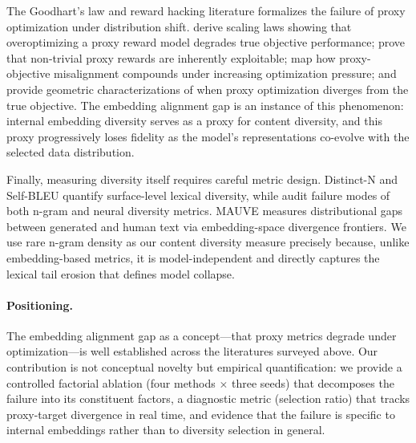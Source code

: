 The Goodhart's law and reward hacking literature formalizes the failure of proxy optimization under distribution shift. \citet{gao2023scaling} derive scaling laws showing that overoptimizing a proxy reward model degrades true objective performance; \citet{skalse2022defining} prove that non-trivial proxy rewards are inherently exploitable; \citet{pan2022effects} map how proxy-objective misalignment compounds under increasing optimization pressure; and \citet{karwowski2024goodhart} provide geometric characterizations of when proxy optimization diverges from the true objective. The embedding alignment gap is an instance of this phenomenon: internal embedding diversity serves as a proxy for content diversity, and this proxy progressively loses fidelity as the model's representations co-evolve with the selected data distribution.

Finally, measuring diversity itself requires careful metric design. Distinct-N \citep{li2016diversity} and Self-BLEU \citep{zhu2018texygen} quantify surface-level lexical diversity, while \citet{tevet2021evaluating} audit failure modes of both n-gram and neural diversity metrics. MAUVE \citep{pillutla2021mauve} measures distributional gaps between generated and human text via embedding-space divergence frontiers. We use rare n-gram density as our content diversity measure precisely because, unlike embedding-based metrics, it is model-independent and directly captures the lexical tail erosion that defines model collapse.

\paragraph{Positioning.} The embedding alignment gap as a concept---that proxy metrics degrade under optimization---is well established across the literatures surveyed above. Our contribution is not conceptual novelty but empirical quantification: we provide a controlled factorial ablation (four methods $\times$ three seeds) that decomposes the failure into its constituent factors, a diagnostic metric (selection ratio) that tracks proxy-target divergence in real time, and evidence that the failure is specific to internal embeddings rather than to diversity selection in general.

